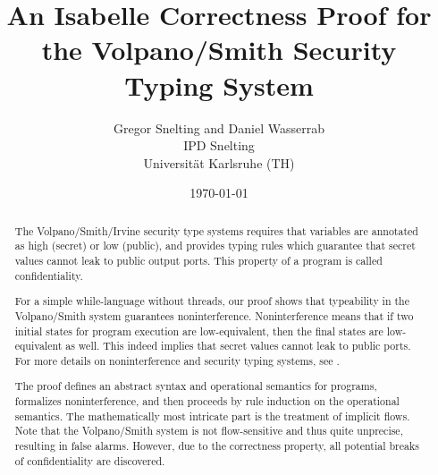 \documentclass[11pt,a4paper]{article}
\begin{document}
\title{An Isabelle Correctness Proof for the Volpano/Smith Security Typing System}

\author{Gregor Snelting and Daniel Wasserrab\\
  IPD Snelting\\Universität Karlsruhe (TH)}

\date{\today}

\maketitle

\begin{abstract}
The Volpano/Smith/Irvine security type systems \cite{VolpanoSmith96} requires
that variables are annotated as high (secret) or low (public), and
provides typing rules which guarantee that secret values cannot leak
to public output ports. This property of a program is called
confidentiality. 

For a simple while-language without threads, our proof shows that
typeability in the Volpano/Smith system guarantees
noninterference. Noninterference means that if two initial states for
program execution are low-equivalent, then the final states are
low-equivalent as well. This indeed implies that secret values cannot
leak to public ports. For more details on noninterference and security
typing systems, see \cite{SabelfeldMyers03}.

The proof defines an abstract syntax and operational semantics for
programs, formalizes noninterference, and then proceeds by rule
induction on the operational semantics. The mathematically most
intricate part is the treatment of implicit flows. Note that the
Volpano/Smith system is not flow-sensitive and thus quite unprecise,
resulting in false alarms. However, due to the correctness property,
all potential breaks of confidentiality are discovered.
\end{abstract}

\clearpage

\tableofcontents

\clearpage





\end{document}
